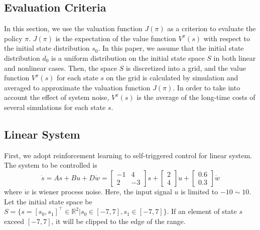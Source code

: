 \documentclass[english, dvipdfmx]{ampmt}             %
\begin{document}
\subsection{Evaluation Criteria}
In this section, we use the valuation function $J(\pi)$ as a criterion to evaluate the policy $\pi$. $J(\pi)$ is the expectation of the value function $V^{\pi}(s)$ with respect to the initial state distribution $s_0$. In this paper, we assume that the initial state distribution $d_0$ is a uniform distribution on the initial state space $S$ in both linear and nonlinear cases. Then, the space $S$ is discretized into a grid, and the value function $V^{\pi}(s)$ for each state $s$ on the grid is calculated by simulation and averaged to approximate the valuation function $J(\pi)$. In order to take into account the effect of system noise, $V^{\pi}(s)$ is the average of the long-time costs of several simulations for each state $s$.\par

\subsection{Linear System}
First, we adopt reinforcement learning to self-triggered control for linear system. The system to be controlled is
\begin{equation}
	\dot{s} = As + Bu + D\dot{w}= \begin{bmatrix}-1& 4 \\ 2 & -3\end{bmatrix}s + \begin{bmatrix}2 \\ 4\end{bmatrix}u + \begin{bmatrix}0.6 \\ 0.3\end{bmatrix}\dot{w}
\end{equation}
where $\dot{w}$ is wiener process noise. Here, the input signal $u$ is limited to $-10 \sim 10$. Let the initial state space be $S = \{s=[s_0, s_1]^{\top}\in \mathbb{R}^2| s_0\in[-7,7], s_1\in[-7,7]\}$. 
If an element of state $s$ exceed $[-7,7]$, it will be clipped to the edge of the range.
\fi
\end{document}
